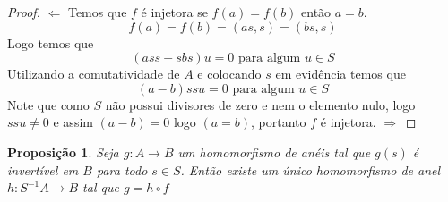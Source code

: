 \documentclass[10pt,a4paper]{article}
\newtheorem{proposition}[theorem]{Proposição}
\begin{document}
\begin{proof}
	$\Leftarrow$ Temos que $f$ é injetora se $f(a)=f(b)$ então $a=b$.
	$$f(a)=f(b)=(as,s)=(bs,s)$$
	Logo temos que
	$$(ass-sbs)u=0 \textrm{ para algum } u \in S$$
	Utilizando a comutatividade de $A$ e colocando $s$ em evidência temos que
	$$(a-b)ssu=0 \textrm{ para algum } u \in S$$
	Note que como $S$ não possui divisores de zero e nem o elemento nulo, logo $ssu \neq 0$ e assim $(a-b)=0$ logo $(a=b)$, portanto $f$ é injetora.	
	\newline
	$\Rightarrow$
\end{proof}

\begin{proposition} Seja $g:A \rightarrow B$ um homomorfismo de anéis tal que $g(s)$ é invertível em $B$ para todo $s \in S$. Então existe um único homomorfismo de anel $h:S^{-1}A \rightarrow B$ tal que $g = h\circ f$
\end{proposition}
\end{document}
